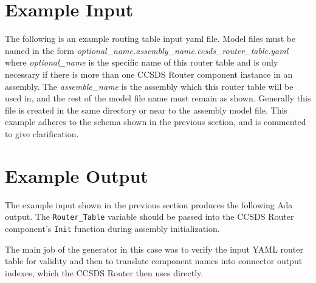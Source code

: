 
\section{Example Input}

The following is an example routing table input yaml file. Model files must be named in the form \textit{optional\_name.assembly\_name.ccsds\_router\_table.yaml} where \textit{optional\_name} is the specific name of this router table and is only necessary if there is more than one CCSDS Router component instance in an assembly. The \textit{assemble\_name} is the assembly which this router table will be used in, and the rest of the model file name must remain as shown. Generally this file is created in the same directory or near to the assembly model file. This example adheres to the schema shown in the previous section, and is commented to give clarification.


\section{Example Output}

The example input shown in the previous section produces the following Ada output. The \texttt{Router\_Table} variable should be passed into the CCSDS Router component's \texttt{Init} function during assembly initialization.

The main job of the generator in this case was to verify the input YAML router table for validity and then to translate component names into connector output indexes, which the CCSDS Router then uses directly.



